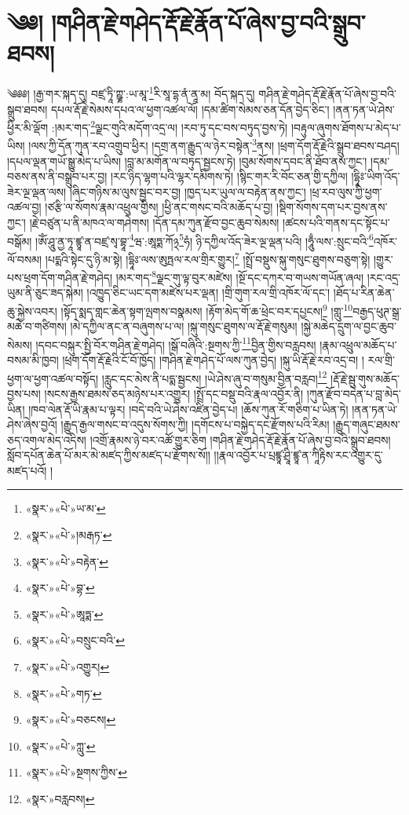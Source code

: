 \chapter{༄༅། །གཤིན་རྗེ་གཤེད་རྡོ་རྗེ་རྣོན་པོ་ཞེས་བྱ་བའི་སྒྲུབ་ཐབས།}༄༅༅། །རྒྱ་གར་སྐད་དུ། བཛྲ་ཏཱི་ཀྵྞ་:ཡ་མཱ་\footnote{«སྣར་»«པེ་»ཡ་མ་}རི་སཱ་དྷ་ནཾ་ནཱ་མ། བོད་སྐད་དུ། གཤིན་རྗེ་གཤེད་རྡོ་རྗེ་རྣོན་པོ་ཞེས་བྱ་བའི་སྒྲུབ་ཐབས། དཔལ་རྡོ་རྗེ་སེམས་དཔའ་ལ་ཕྱག་འཚལ་ལོ། །དམ་ཚིག་སེམས་ཅན་དོན་བྱེད་ཅིང་། །ནན་ཏན་ཡེ་ཤེས་ཕྱིར་མི་ལྡོག :།མར་གད་\footnote{«སྣར་»«པེ་»།མརྒཏ་}ལྗང་གུའི་མདོག་འདྲ་ལ། །རབ་ཏུ་དང་བས་བཏུད་བྱས་ཏེ། །བརྟུལ་ཞུགས་ཐོགས་པ་མེད་པ་ཡིས། །ལས་ཀྱི་དོན་ཀུན་རབ་འགྲུབ་ཕྱིར། །དགྲ་ནག་རྒྱུད་ལ་ཉེར་བསྟེན་\footnote{«སྣར་»«པེ་»བརྟེན་}ནས། །ཕྲག་དོག་རྡོ་རྗེའི་སྒྲུབ་ཐབས་བཤད། །དཔལ་ལྡན་གཡོ་སྒྱུ་མེད་པ་ཡིས། །བླ་མ་མགོན་ལ་བཏུད་སྦྱངས་ཏེ། །བུམ་སོགས་དབང་ནི་ཐོབ་ནས་ཀྱང་། །དམ་བཅས་ནས་ནི་བསྒྲུབ་པར་བྱ། །རང་ཉིད་ལྷག་པའི་ལྷར་དམིགས་ཏེ། །སྙིང་གར་རི་བོང་ཅན་གྱི་དཀྱིལ། །དྷཱིཿ་ཡིག་འོད་ཟེར་ལྔ་ལྡན་ལས། །ཞིང་གཉིས་མ་ལུས་སྦྱང་བར་བྱ། །ཁྱད་པར་ཡུལ་ལ་བརྟེན་ནས་ཀྱང་། །ཕྲ་རབ་ལུས་ཀྱི་ཕྱག་འཚལ་བྱ། །ཙརྩི་ལ་སོགས་རྣམ་འཕྲུལ་གྱིས། །ཕྱི་ནང་གསང་བའི་མཆོད་པ་བྱ། །སྡིག་སོགས་དག་པར་བྱས་ནས་ཀྱང་། །རྗེ་བཙུན་པ་ནི་མཁའ་ལ་གཤེགས། །དོན་དམ་ཀུན་རྫོབ་བྱང་ཆུབ་སེམས། །ཚངས་པའི་གནས་དང་སྟོང་པ་བསྒོམ། །ཨོཾ་ཤཱུ་ནྱ་ཏཱ་ཛྙཱ་ན་བཛྲ་སྭ་བྷཱ་\footnote{«སྣར་»«པེ་»བྷ་}ཝ་:ཨཱཏྨ་ཀོ྅\footnote{«སྣར་»«པེ་»ཨཱཏྨ་}ཧཾ། ཉི་དཀྱིལ་འོད་ཟེར་ལྔ་ལྡན་པའི། །ཧཱུྃ་ལས་:སྲུང་བའི་\footnote{«སྣར་»«པེ་»བསྲུང་བའི་}འཁོར་ལོ་བསམ། །པདྨའི་སྟེང་དུ་ཉི་མ་སྟེ། །དྷཱིཿ་ལས་ཨུཏྤལ་རལ་གྲིར་གྱུར།\footnote{«སྣར་»«པེ་»འགྱུར།} །སྤྲོ་བསྡུས་སྐུ་གསུང་ཐུགས་བཅུག་སྟེ། །གྱུར་པས་ཕྲག་དོག་གཤིན་རྗེ་གཤེད། །མར་གད་\footnote{«སྣར་»«པེ་»གཏ་}ལྗང་གུ་ལྟ་བུར་མཛེས། །སྔོ་དང་དཀར་བ་གཡས་གཡོན་ཞལ། །རང་འདྲ་ཡུམ་ནི་ཅུང་ཟད་སྐེམ། །འཁྱུད་ཅིང་ཡང་དག་མཛེས་པར་ལྡན། །གྲི་གུག་རལ་གྲི་འཁོར་ལོ་དང་། །ཐོད་པ་རིན་ཆེན་ཆུ་སྐྱེས་འབར། །སྟོད་སྨད་གླང་ཆེན་སྟག་ལྤགས་བསྣམས། །རྟོག་མེད་གོ་ཆ་ཕྲེང་བར་དཔྱངས།\footnote{«སྣར་»«པེ་»བཅངས།} །གླུ་\footnote{«སྣར་»«པེ་»ཀླུ་}བརྒྱད་ཕུཊ་སྒྲ་མཆེ་བ་གཙིགས། །མེ་དཀྱིལ་ནང་ན་བཞུགས་པ་ལ། །སྐུ་གསུང་ཐུགས་ལ་རྡོ་རྗེ་གསུམ། །སྐྱེ་མཆེད་དྲུག་ལ་བྱང་ཆུབ་སེམས། །དབང་བསྐུར་སྤྱི་བོར་གཤིན་རྗེ་གཤེད། །སྒོ་བཞིའི་:སྔགས་ཀྱི་\footnote{«སྣར་»«པེ་»སྔགས་ཀྱིས་}བྱིན་གྱིས་བརླབས། །རྣམ་འཕྲུལ་མཆོད་པ་བསམ་མི་ཁྱབ། །ཕྲག་དོག་རྡོ་རྗེའི་ངོ་བོ་ཁྱོད། །གཤིན་རྗེ་གཤེད་པོ་ལས་ཀུན་བྱེད། །སྐུ་ཡི་རྡོ་རྗེ་རབ་འདྲ་བ། །
རལ་གྲི་ཕྱག་ལ་ཕྱག་འཚལ་བསྟོད། །རླུང་དང་མེས་ནི་པདྨ་སྦྱངས། །ཡེ་ཤེས་ཞུ་བ་གསུམ་བྱིན་བརླབ།\footnote{«སྣར་»བརླབས།} །རྡོ་རྗེ་སྦུ་གུས་མཆོད་བྱས་པས། །སངས་རྒྱས་ཐམས་ཅད་མཉེས་པར་འགྱུར། །སྤྲོ་དང་བསྡུ་བའི་རྣལ་འབྱོར་ནི། །ཀུན་རྫོབ་བདེན་པ་བླ་མེད་ཡིན། །ཁབ་ལེན་རྡོ་ཡི་རྣམ་པ་ལྟར། །བདེ་བའི་ཡེ་ཤེས་འཛིན་བྱེད་པ། །ཆོས་ཀུན་རོ་གཅིག་པ་ཡིན་ཏེ། །ནན་ཏན་ཡེ་ཤེས་ཞེས་བྱའོ། །རྒྱུད་རྒྱལ་གསང་བ་འདུས་སོགས་ཀྱི། །དགོངས་པ་བསྐྱེད་དང་རྫོགས་པའི་རིམ། །རྒྱུད་གཞུང་ཐམས་ཅད་འགལ་མེད་འདིས། །འགྲོ་རྣམས་ཉེ་བར་འཚོ་གྱུར་ཅིག །གཤིན་རྗེ་གཤེད་རྡོ་རྗེ་རྣོན་པོ་ཞེས་བྱ་བའི་སྒྲུབ་ཐབས། སློབ་དཔོན་ཆེན་པོ་མར་མེ་མཛད་ཀྱིས་མཛད་པ་རྫོགས་སོ།། །།རྣལ་འབྱོར་པ་པྲཛྙཱ་ཤྲཱི་ཛྙཱ་ན་ཀཱིརྟིས་རང་འགྱུར་དུ་མཛད་པའོ། ། 